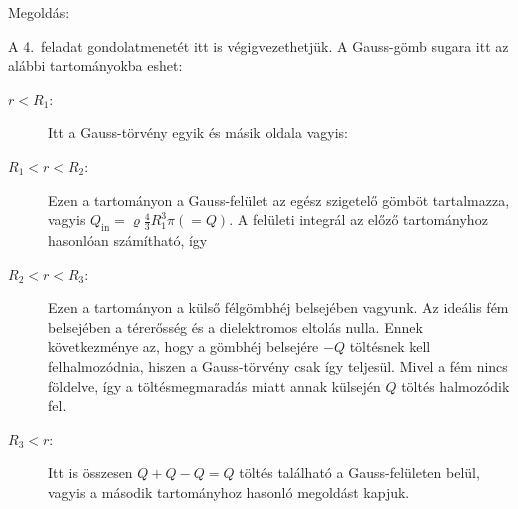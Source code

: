 
\ifdefined\megoldas

 Megoldás: 

 A 4.~feladat gondolatmenetét itt is végigvezethetjük. A Gauss-gömb sugara itt az alábbi tartományokba eshet:
 \begin{description}
  \item [$r<R_1$:]
   Itt a Gauss-törvény egyik és másik oldala
   vagyis:
   
  \item [$R_1<r<R_2$:]
   Ezen a tartományon a Gauss-felület az egész szigetelő gömböt tartalmazza, vagyis $Q_\text{in}=\varrho\frac{4}{3}R_1^3\pi(=Q)$. A felületi integrál az előző tartományhoz hasonlóan számítható, így
 \end{description}

 \begin{description}
  \item [$R_2<r<R_3$:] 
   Ezen a tartományon a külső félgömbhéj belsejében vagyunk. Az ideális fém belsejében a térerősség és a dielektromos eltolás nulla. Ennek következménye az, hogy a gömbhéj belsejére $-Q$ töltésnek kell felhalmozódnia, hiszen a Gauss-törvény csak így teljesül. Mivel a fém nincs földelve, így a töltésmegmaradás miatt annak külsején $Q$ töltés halmozódik fel. 
   
  \item [$R_3<r$:]
   Itt is összesen $Q+Q-Q=Q$ töltés található a Gauss-felületen belül, vagyis a második tartományhoz hasonló megoldást kapjuk.
 \end{description}

